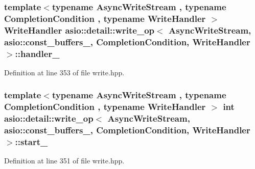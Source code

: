 \subsubsection[{handler\+\_\+}]{\setlength{\rightskip}{0pt plus 5cm}template$<$typename Async\+Write\+Stream , typename Completion\+Condition , typename Write\+Handler $>$ Write\+Handler {\bf asio\+::detail\+::write\+\_\+op}$<$ Async\+Write\+Stream, {\bf asio\+::const\+\_\+buffers\+\_},                           Completion\+Condition, Write\+Handler $>$\+::handler\+\_\+}\label{classasio_1_1detail_1_1write__op_3_01_async_write_stream_00_01asio_1_1const__buffers__1_00_01_014e1524567dd7f87180ace12b51858864_a729cb8777b160fe9b1595ec3c8b82209}


Definition at line 353 of file write.\+hpp.

\hypertarget{classasio_1_1detail_1_1write__op_3_01_async_write_stream_00_01asio_1_1const__buffers__1_00_01_014e1524567dd7f87180ace12b51858864_a713a588c87a9dcd3876061cd47f2e2cc}{}
\subsubsection[{start\+\_\+}]{\setlength{\rightskip}{0pt plus 5cm}template$<$typename Async\+Write\+Stream , typename Completion\+Condition , typename Write\+Handler $>$ int {\bf asio\+::detail\+::write\+\_\+op}$<$ Async\+Write\+Stream, {\bf asio\+::const\+\_\+buffers\+\_},                           Completion\+Condition, Write\+Handler $>$\+::start\+\_\+}\label{classasio_1_1detail_1_1write__op_3_01_async_write_stream_00_01asio_1_1const__buffers__1_00_01_014e1524567dd7f87180ace12b51858864_a713a588c87a9dcd3876061cd47f2e2cc}


Definition at line 351 of file write.\+hpp.

